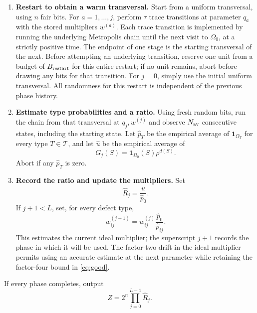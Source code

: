 \documentclass[11pt]{article}
\theoremstyle{definition}
\newcommand{\one}{\mathbf 1}
\newcommand{\Om}{\Omega}
\begin{document}
\begin{enumerate}[label=\textbf{\arabic*.},leftmargin=*]
\item \textbf{Restart to obtain a warm transversal.}
Start from a uniform transversal, using $n$ fair bits.  For
$a=1,\ldots,j$, perform $\tau$ trace transitions at parameter $q_a$
with the stored multipliers $w^{(a)}$.  Each trace transition is
implemented by running the underlying Metropolis chain until the next
visit to $\Om_0$, at a strictly positive time.  The endpoint of one
stage is the starting transversal of the next.  Before attempting an
underlying transition, reserve one unit from a budget of
$B_{\rm restart}$ for this entire restart; if no unit remains, abort
before drawing any bits for that transition.
For $j=0$, simply use the initial uniform transversal.  All randomness
for this restart is independent of the previous phase history.

\item \textbf{Estimate type probabilities and a ratio.}
Using fresh random bits, run the chain from that transversal at
$q_j,w^{(j)}$ and observe
$N_{\rm av}$ consecutive states, including the starting state.  Let
$\widehat p_T$ be the empirical average of $\one_{\Om_T}$ for every
type $T\in\mathcal T$, and let $\widehat u$ be the empirical average of
\begin{equation}\label{eq:ratioobservable}
 G_j(S)=\one_{\Om_0}(S)\rho^{d(S)}.
\end{equation}
Abort if any $\widehat p_T$ is zero.

\item \textbf{Record the ratio and update the multipliers.}
Set
\begin{equation}\label{eq:updates}
 \widehat R_j=\frac{\widehat u}{\widehat p_0}.
\end{equation}
If $j+1<L$, set, for every defect type,
\begin{equation}\label{eq:weightupdate}
 w^{(j+1)}_{ij}=w^{(j)}_{ij}\frac{\widehat p_0}{\widehat p_{ij}}.
\end{equation}
This estimates the current ideal multiplier; the superscript $j+1$
records the phase in which it will be used.  The factor-two drift in
the ideal multiplier permits using an accurate estimate at the next
parameter while retaining the factor-four bound in \eqref{eq:good}.
\end{enumerate}
If every phase completes, output
\begin{equation}\label{eq:estimator}
 \widehat Z=2^n\prod_{j=0}^{L-1}\widehat R_j.
\end{equation}
\end{document}
